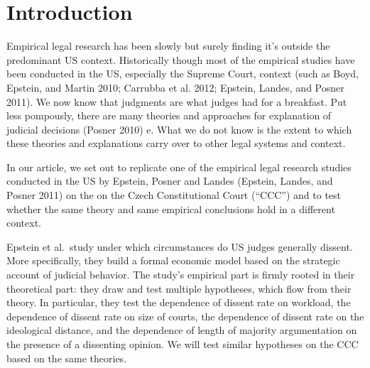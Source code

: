 \documentclass[
  11pt,
]{article}
\begin{document}
\vskip -8.5pt

{
\hypersetup{linkcolor=black}
\setcounter{tocdepth}{2}
\tableofcontents
}


{
\setcounter{tocdepth}{2}
\tableofcontents
}

\setlength{\parindent}{16pt}
\setlength{\parskip}{0pt}

\doublespacing
\vspace{30pt}

\hypertarget{introduction}{%
\section{Introduction}\label{introduction}}

Empirical legal research has been slowly but surely finding it's outside
the predominant US context. Historically though most of the empirical
studies have been conducted in the US, especially the Supreme Court,
context (such as Boyd, Epstein, and Martin 2010; Carrubba et al. 2012;
Epstein, Landes, and Posner 2011). We now know that judgments are what
judges had for a breakfast. Put less pompously, there are many theories
and approaches for explanation of judicial decisions (Posner 2010) e.
What we do not know is the extent to which these theories and
explanations carry over to other legal systems and context.

In our article, we set out to replicate one of the empirical legal
research studies conducted in the US by Epstein, Posner and Landes
(Epstein, Landes, and Posner 2011) on the on the Czech Constitutional
Court (``CCC'') and to test whether the same theory and same empirical
conclusions hold in a different context.

Epstein et al.~study under which circumstances do US judges generally
dissent. More specifically, they build a formal economic model based on
the strategic account of judicial behavior. The study's empirical part
is firmly rooted in their theoretical part: they draw and test multiple
hypotheses, which flow from their theory. In particular, they test the
dependence of dissent rate on workload, the dependence of dissent rate
on size of courts, the dependence of dissent rate on the ideological
distance, and the dependence of length of majority argumentation on the
presence of a dissenting opinion. We will test similar hypotheses on the
CCC based on the same theories.
\end{document}
